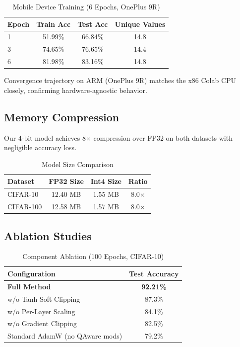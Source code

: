 \documentclass[conference]{IEEEtran}
\begin{document}
\begin{table}[h]
\centering
\caption{Mobile Device Training (6 Epochs, OnePlus 9R)}
\label{tab:mobile}
\begin{tabular}{@{}lccc@{}}
\toprule
\textbf{Epoch} & \textbf{Train Acc} & \textbf{Test Acc} & \textbf{Unique Values} \\
\midrule
1 & 51.99\% & 66.84\% & 14.8 \\
3 & 74.65\% & 76.65\% & 14.4 \\
6 & 81.98\% & 83.16\% & 14.8 \\
\bottomrule
\end{tabular}
\end{table}

Convergence trajectory on ARM (OnePlus 9R) matches the x86 Colab CPU closely, confirming hardware-agnostic behavior.

\subsection{Memory Compression}
Our 4-bit model achieves 8$\times$ compression over FP32 on both datasets with negligible accuracy loss.

\begin{table}[h]
\centering
\caption{Model Size Comparison}
\label{tab:memory}
\begin{tabular}{@{}lccc@{}}
\toprule
\textbf{Dataset} & \textbf{FP32 Size} & \textbf{Int4 Size} & \textbf{Ratio} \\
\midrule
CIFAR-10  & 12.40 MB & 1.55 MB & 8.0$\times$ \\
CIFAR-100 & 12.58 MB & 1.57 MB & 8.0$\times$ \\
\bottomrule
\end{tabular}
\end{table}

\subsection{Ablation Studies}

\begin{table}[h]
\centering
\caption{Component Ablation (100 Epochs, CIFAR-10)}
\label{tab:ablation}
\begin{tabular}{@{}lc@{}}
\toprule
\textbf{Configuration} & \textbf{Test Accuracy} \\
\midrule
\textbf{Full Method} & \textbf{92.21\%} \\
w/o Tanh Soft Clipping & 87.3\% \\
w/o Per-Layer Scaling & 84.1\% \\
w/o Gradient Clipping & 82.5\% \\
Standard AdamW (no QAware mods) & 79.2\% \\
\bottomrule
\end{tabular}
\end{table}
\end{document}
